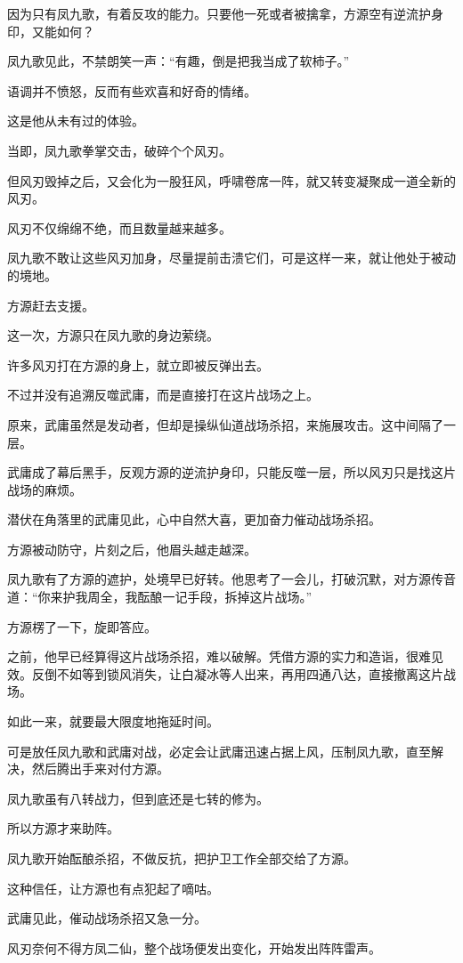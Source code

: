 \begin{this_body}
因为只有凤九歌，有着反攻的能力。只要他一死或者被擒拿，方源空有逆流护身印，又能如何？

凤九歌见此，不禁朗笑一声：“有趣，倒是把我当成了软柿子。”

语调并不愤怒，反而有些欢喜和好奇的情绪。

这是他从未有过的体验。

当即，凤九歌拳掌交击，破碎个个风刃。

但风刃毁掉之后，又会化为一股狂风，呼啸卷席一阵，就又转变凝聚成一道全新的风刃。

风刃不仅绵绵不绝，而且数量越来越多。

凤九歌不敢让这些风刃加身，尽量提前击溃它们，可是这样一来，就让他处于被动的境地。

方源赶去支援。

这一次，方源只在凤九歌的身边萦绕。

许多风刃打在方源的身上，就立即被反弹出去。

不过并没有追溯反噬武庸，而是直接打在这片战场之上。

原来，武庸虽然是发动者，但却是操纵仙道战场杀招，来施展攻击。这中间隔了一层。

武庸成了幕后黑手，反观方源的逆流护身印，只能反噬一层，所以风刃只是找这片战场的麻烦。

潜伏在角落里的武庸见此，心中自然大喜，更加奋力催动战场杀招。

方源被动防守，片刻之后，他眉头越走越深。

凤九歌有了方源的遮护，处境早已好转。他思考了一会儿，打破沉默，对方源传音道：“你来护我周全，我酝酿一记手段，拆掉这片战场。”

方源楞了一下，旋即答应。

之前，他早已经算得这片战场杀招，难以破解。凭借方源的实力和造诣，很难见效。反倒不如等到锁风消失，让白凝冰等人出来，再用四通八达，直接撤离这片战场。

如此一来，就要最大限度地拖延时间。

可是放任凤九歌和武庸对战，必定会让武庸迅速占据上风，压制凤九歌，直至解决，然后腾出手来对付方源。

凤九歌虽有八转战力，但到底还是七转的修为。

所以方源才来助阵。

凤九歌开始酝酿杀招，不做反抗，把护卫工作全部交给了方源。

这种信任，让方源也有点犯起了嘀咕。

武庸见此，催动战场杀招又急一分。

风刃奈何不得方凤二仙，整个战场便发出变化，开始发出阵阵雷声。


\end{this_body}
